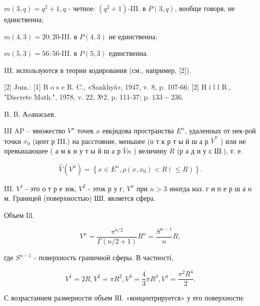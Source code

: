 \documentclass[10pt]{article}
\begin{document}
$m(3, q)=q^{2}+1, q$ - четное: $\left(q^{2}+1\right)$-III. в $P(3, q)$, вообще говоря, не единственна;



$m(4,3)=20: 20$-III. в $P(4,3)$ не единственна;



$m(5,3)=56: 56$-III. в $P(5,3)$ единственна.



III. используются в теории кодирования (см., например, [2]).



[2] Jum.: [1] B o s e R. C., «Sankhyă», 1947, v. 8, p. 107-66; [2] H i l l R., "Discrete Math.", 1978, v. 22, №2, p. 111-37; p. $133-236$.

B. B. Аøанасьев.



III AP -- множество $V^{n}$ точек $x$ евкјидова пространства $E^{n}$, удаленных от нек-рой точки $x_{0}$ (цент р III.) на расстояние, меньшее (о т к р т ы й ш а р $\dot{V}^{n}$ ) или не превышаюшее ( а м к н у т ы й ш а р $\bar{V} n$ ) величину $R$ (р а д и у с Ш.), т. е.



\[

\stackrel{\circ}{V}\left(\overline{V^{n}}\right)=\left\{x \in E^{n}, \rho\left(x, x_{0}\right)<R(\leqslant R)\right\} .

\]



III. $V^{1}$ - это о т р е зок, $V^{2}$ - эток р у г, $V^{n}$ при $n>3$ иногда наз. г и п е р ш а о м. Границей (поверхностью) ШІ. является сфера.



Объем Ill.



\[

V^{n}=\frac{\pi^{n / 2}}{\Gamma(n / 2+1)} R^{n}=\frac{S^{n-1}}{n} R,

\]



где $S^{n-1}$ - поверхность граничной сферы. В частності,



\[

V^{1}=2 R, V^{2}=\pi R^{2}, V^{3}=\frac{4}{3} \pi R^{3}, V^{4}=\frac{\pi^{2} R^{4}}{2} .

\]



С возрастанием размерности объем ІІІ. «концентрируется» у его поверхности:
\end{document}
